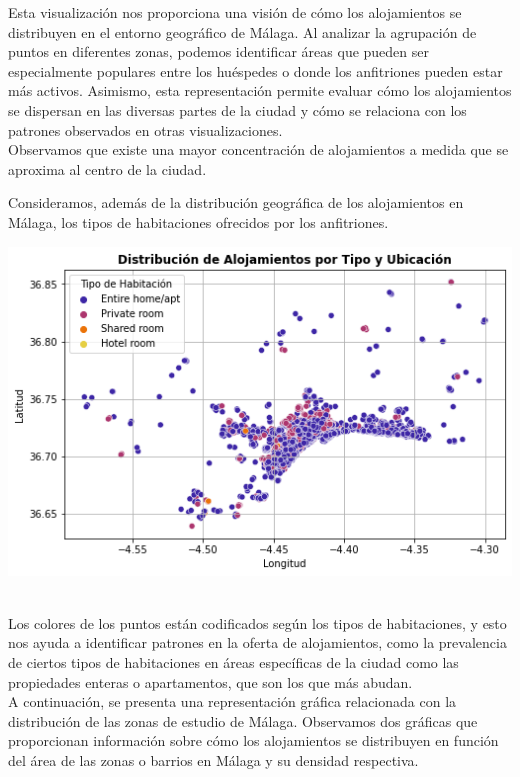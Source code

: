 Esta visualización nos proporciona una visión de cómo los alojamientos se distribuyen en el entorno geográfico de Málaga. Al analizar la agrupación de puntos en diferentes zonas, podemos identificar áreas que pueden ser especialmente populares entre los huéspedes o donde los anfitriones pueden estar más activos. Asimismo, esta representación permite evaluar cómo los alojamientos se dispersan en las diversas partes de la ciudad y cómo se relaciona con los patrones observados en otras visualizaciones.\\
Observamos que existe una mayor concentración de alojamientos a medida que se aproxima al centro de la ciudad.
\newpage

Consideramos, además de la distribución geográfica de los alojamientos en Málaga, los tipos de habitaciones ofrecidos por los anfitriones. \\
\begin{center}
    \centering
    \includegraphics[width=1\textwidth]{capturas/4.png}
\end{center}
\ \\
Los colores de los puntos están codificados según los tipos de habitaciones, y esto nos ayuda a identificar patrones en la oferta de alojamientos, como la prevalencia de ciertos tipos de habitaciones en áreas específicas de la ciudad como las propiedades enteras o apartamentos, que son los que más abudan.\\

A continuación, se presenta una representación gráfica relacionada con la distribución de las zonas de estudio de Málaga. Observamos dos gráficas que proporcionan información sobre cómo los alojamientos se distribuyen en función del área de las zonas o barrios en Málaga y su densidad respectiva.

